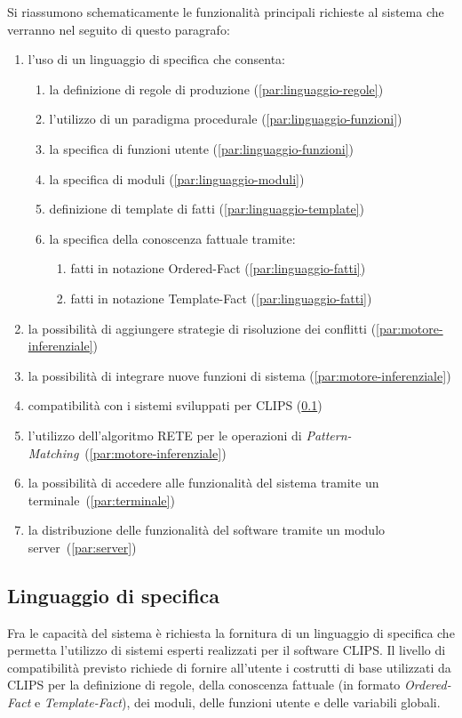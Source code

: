 Si riassumono schematicamente le funzionalità principali richieste al sistema che verranno nel seguito di questo paragrafo:

\begin{enumerate}
	\item l'uso di un linguaggio di specifica che consenta:
		\begin{enumerate}
			\item la definizione di regole di produzione (\ref{par:linguaggio-regole})
			\item l'utilizzo di un paradigma procedurale (\ref{par:linguaggio-funzioni})
			\item la specifica di funzioni utente (\ref{par:linguaggio-funzioni})
			\item la specifica di moduli (\ref{par:linguaggio-moduli})
			\item definizione di template di fatti (\ref{par:linguaggio-template})
			\item la specifica della conoscenza fattuale tramite:
				\begin{enumerate}
					\item fatti in notazione Ordered-Fact (\ref{par:linguaggio-fatti})
					\item fatti in notazione Template-Fact (\ref{par:linguaggio-fatti})
				\end{enumerate}
		\end{enumerate}
	\item la possibilità di aggiungere strategie di risoluzione dei conflitti (\ref{par:motore-inferenziale})
	\item la possibilità di integrare nuove funzioni di sistema (\ref{par:motore-inferenziale})
	\item compatibilità con i sistemi sviluppati per CLIPS (\ref{par:linguaggio})
	\item l'utilizzo dell'algoritmo RETE per le operazioni di \emph{Pattern-Matching}~(\ref{par:motore-inferenziale})
	\item la possibilità di accedere alle funzionalità del sistema tramite un terminale~(\ref{par:terminale})
	\item la distribuzione delle funzionalità del software tramite un modulo server~(\ref{par:server})
\end{enumerate}


\subsection{Linguaggio di specifica}\label{par:linguaggio}
Fra le capacità del sistema è richiesta la fornitura di un linguaggio di specifica che permetta l'utilizzo di sistemi esperti realizzati per il software CLIPS. Il livello di compatibilità previsto richiede di fornire all'utente i costrutti di base utilizzati da CLIPS per la definizione di regole, della conoscenza fattuale (in formato \emph{Ordered-Fact} e \emph{Template-Fact}), dei moduli, delle funzioni utente e delle variabili globali.

